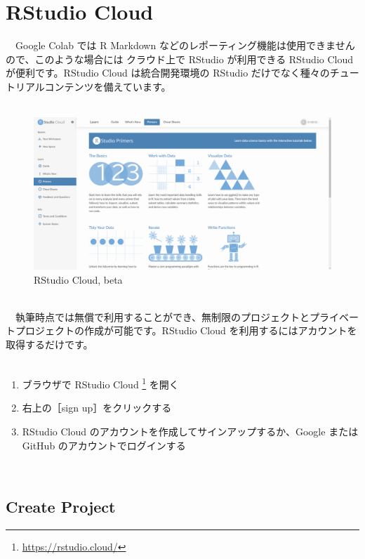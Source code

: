\documentclass[
  12pt,
]{book}
\DeclareRobustCommand{\href}[2]{#2\footnote{\url{#1}}}
\providecommand{\tightlist}{%
  \setlength{\itemsep}{0pt}\setlength{\parskip}{0pt}}
\begin{document}
\hypertarget{rstudio-cloud-1}{%
\section{RStudio Cloud}\label{rstudio-cloud-1}}

　Google Colab では R Markdown などのレポーティング機能は使用できませんので、このような場合には クラウド上で RStudio が利用できる RStudio Cloud が便利です。RStudio Cloud は統合開発環境の RStudio だけでなく種々のチュートリアルコンテンツを備えています。\\
　\\

\begin{figure}[H]

{\centering \includegraphics[width=0.8\linewidth,]{fig/RStudio/RSCloud_00} 

}

\caption{RStudio Cloud, beta}\label{fig:unnamed-chunk-81}
\end{figure}

　\\
　執筆時点では無償で利用することができ、無制限のプロジェクトとプライベートプロジェクトの作成が可能です。RStudio Cloud を利用するにはアカウントを取得するだけです。\\
　

\begin{enumerate}
\def\labelenumi{\arabic{enumi}.}
\tightlist
\item
  ブラウザで \href{https://rstudio.cloud/}{RStudio Cloud } を開く
\item
  右上の［sign up］をクリックする
\item
  RStudio Cloud のアカウントを作成してサインアップするか、Google または GitHub のアカウントでログインする
\end{enumerate}

　

\hypertarget{create-project}{%
\subsection{Create Project}\label{create-project}}
\end{document}
